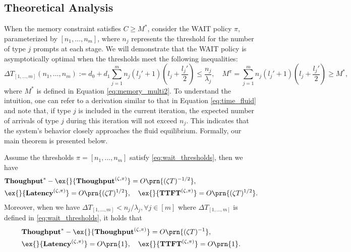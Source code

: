 \subsection{Theoretical Analysis}
\label{subsec:main_theorem}
When the memory constraint satisfies \(C \geq M^*\), consider the WAIT policy \(\pi\), parameterized by \([n_1, \dots, n_m]\), where \(n_j\) represents the threshold for the number of type \(j\) prompts at each stage. We will demonstrate that the WAIT policy is asymptotically optimal when the thresholds meet the following inequalities:
\begin{equation}
\label{eq:wait_thresholds}
\Delta T_{[1,\dots,m]}(n_1,\dots,n_m):=d_0 + d_1 \sum_{j=1}^m n_j (l_j' + 1) \left( l_j + \frac{l_j'}{2} \right) \leq \frac{n_j}{\lambda_j}, \quad M^{\pi} = \sum_{j=1}^m n_j (l_j' + 1) \left( l_j + \frac{l_j'}{2} \right) \geq M^*,
\end{equation}
where \(M^*\) is defined in Equation \eqref{eq:memory_multi2}. To understand the intuition, one can refer to a derivation similar to that in Equation \eqref{eq:time_fluid} and note that, if type \(j\) is included in the current iteration, the expected number of arrivals of type \(j\) during this iteration will not exceed \(n_j\). This indicates that the system’s behavior closely approaches the fluid equilibrium. Formally, our main theorem is presented below.



\begin{theorem}
\label{thm:wait_heavy_traffic}
    Assume the thresholds $\pi=[n_1,\dots,n_m]$ satisfy \eqref{eq:wait_thresholds}, then we have 
    \begin{align*}
        &\throughput^*-\ex{}{\throughput^{(\zeta,\pi)}} = O\prn{(\zeta T)^{-1/2}},\\ 
        &\ex{}{\Latency^{(\zeta,\pi)}} = O\prn{(\zeta T)^{1/2}},\quad\ex{}{\TTFT^{(\zeta,\pi)}}=O\prn{(\zeta T)^{1/2}}.
    \end{align*}
    Moreover, when we have $\Delta T_{[1,\dots,m]}<n_j/\lambda_j,\forall j\in[m]$ where $\Delta T_{[1,\dots,m]}$ is defined in \eqref{eq:wait_thresholds}, it holds that
        \begin{align*}
        &\throughput^*-\ex{}{\throughput^{(\zeta,\pi)}} = O\prn{(\zeta T)^{-1}},\\ 
        &\ex{}{\Latency^{(\zeta,\pi)}} = O\prn{1},\quad\ex{}{\TTFT^{(\zeta,\pi)}}=O\prn{1}.
    \end{align*}
\end{theorem}



